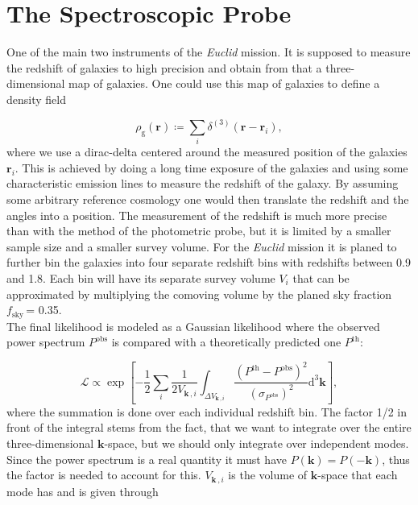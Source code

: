 \documentclass[oneside]{book}
\newcommand*{\Euclid}{\textit{Euclid}\xspace}
\newcommand*{\rd}{\mathrm{d}}
\begin{document}
\chapter{The Spectroscopic Probe}

One of the main two instruments of the \Euclid mission. It is supposed to measure the redshift of galaxies to high precision and obtain from that a three-dimensional
map of galaxies. One could use this map of galaxies to define a density field 

\begin{equation}
    \rho_\mathrm{g}(\boldsymbol{r}) \coloneq \sum_i \delta^{(3)}(\boldsymbol{r}-\boldsymbol{r}_i),
\end{equation}
where we use a dirac-delta centered around the measured position of the galaxies $\boldsymbol{r}_i$. This is achieved by doing a long time exposure of the galaxies and using some characteristic emission lines to measure the redshift of the galaxy. By assuming some arbitrary reference cosmology one would then translate the redshift and the angles into a position. The measurement of the redshift is much more precise than with the method of the photometric probe, but it is limited by a smaller sample size and a smaller survey volume. For the \Euclid mission it is planed to further bin the galaxies into four separate redshift bins with redshifts between 0.9 and 1.8. Each bin will have its separate survey volume $V_i$ that can be approximated by multiplying the comoving volume by the planed sky fraction $f_\mathrm{sky}\,$= 0.35.\\
The final likelihood is modeled as a Gaussian likelihood where the observed power spectrum $P^\mathrm{obs}$ is compared with a theoretically predicted one $P^\mathrm{th}$: 

\begin{equation}
   \mathcal{L} \propto \exp\left[-\frac{1}{2} \sum_i \frac{1}{2 V_{\boldsymbol{k}\,,i}} \int_{\Delta V_{\boldsymbol{k}\,,i}} \frac{\left(P^\mathrm{th}-P^\mathrm{obs}\right)^2}{\left(\sigma_{P^\mathrm{obs}}\right)^2} \rd^3 \boldsymbol{k} \right],
\end{equation} 
where the summation is done over each individual redshift bin. The factor 1/2 in front of the integral stems from the fact, that we want to integrate over the entire three-dimensional $\boldsymbol{k}$-space, but we should only integrate over independent modes. Since the power spectrum is a real quantity it must have $P(\boldsymbol{k})=P(-\boldsymbol{k})$, thus the factor is needed to account for this. $V_{\boldsymbol{k}\,,i}$ is the volume of $\boldsymbol{k}$-space that each mode has and is given through
\end{document}
